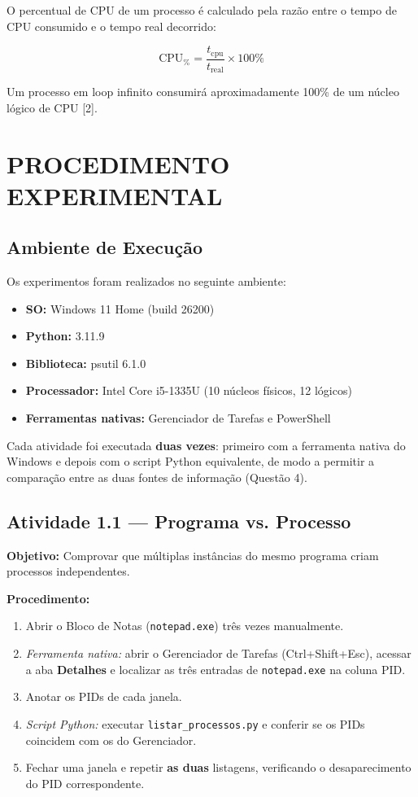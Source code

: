 \documentclass[12pt,a4paper]{article}
\begin{document}
O percentual de CPU de um processo é calculado pela razão entre o tempo de CPU consumido e o tempo real decorrido:

\begin{equation}
\text{CPU}_{\%} = \frac{t_{\text{cpu}}}{t_{\text{real}}} \times 100\%
\end{equation}

Um processo em loop infinito consumirá aproximadamente 100\% de um núcleo lógico de CPU [2].

\section{PROCEDIMENTO EXPERIMENTAL}

\subsection{Ambiente de Execução}

Os experimentos foram realizados no seguinte ambiente:
\begin{itemize}
    \item \textbf{SO:} Windows 11 Home (build 26200)
    \item \textbf{Python:} 3.11.9
    \item \textbf{Biblioteca:} psutil 6.1.0
    \item \textbf{Processador:} Intel Core i5-1335U (10 núcleos físicos, 12 lógicos)
    \item \textbf{Ferramentas nativas:} Gerenciador de Tarefas e PowerShell
\end{itemize}

Cada atividade foi executada \textbf{duas vezes}: primeiro com a ferramenta nativa do Windows e depois com o script Python equivalente, de modo a permitir a comparação entre as duas fontes de informação (Questão 4).

\subsection{Atividade 1.1 — Programa vs. Processo}

\textbf{Objetivo:} Comprovar que múltiplas instâncias do mesmo programa criam processos independentes.

\textbf{Procedimento:}
\begin{enumerate}
    \item Abrir o Bloco de Notas (\texttt{notepad.exe}) três vezes manualmente.
    \item \textit{Ferramenta nativa:} abrir o Gerenciador de Tarefas (Ctrl+Shift+Esc), acessar a aba \textbf{Detalhes} e localizar as três entradas de \texttt{notepad.exe} na coluna PID.
    \item Anotar os PIDs de cada janela.
    \item \textit{Script Python:} executar \texttt{listar\_processos.py} e conferir se os PIDs coincidem com os do Gerenciador.
    \item Fechar uma janela e repetir \textbf{as duas} listagens, verificando o desaparecimento do PID correspondente.
\end{enumerate}
\end{document}
